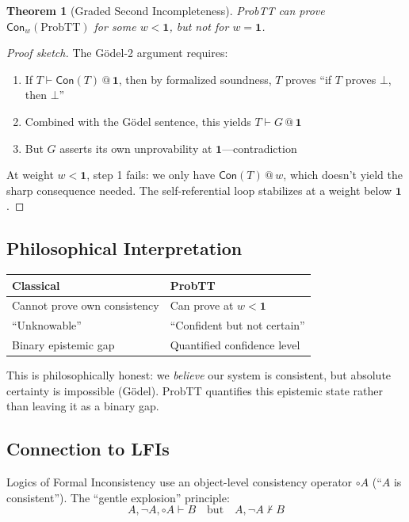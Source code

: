 \documentclass[11pt,a4paper]{article}
\makeatletter
\newtheorem{theorem}{Theorem}[section]
\newcommand{\at}[1]{\,@\,#1}
\newcommand{\one}{\mathbf{1}}
\makeatother
\begin{document}
\begin{theorem}[Graded Second Incompleteness]
ProbTT can prove $\mathsf{Con}_w(\text{ProbTT})$ for some $w < \one$, but not for $w = \one$.
\end{theorem}

\begin{proof}[Proof sketch]
The G\"odel-2 argument requires:
\begin{enumerate}
    \item If $T \vdash \mathsf{Con}(T) \at{\one}$, then by formalized soundness, $T$ proves ``if $T$ proves $\bot$, then $\bot$''
    \item Combined with the G\"odel sentence, this yields $T \vdash G \at{\one}$
    \item But $G$ asserts its own unprovability at $\one$---contradiction
\end{enumerate}

At weight $w < \one$, step 1 fails: we only have $\mathsf{Con}(T) \at{w}$, which doesn't yield the sharp consequence needed. The self-referential loop stabilizes at a weight below $\one$.
\end{proof}

\subsection{Philosophical Interpretation}

\begin{center}
\begin{tabular}{l|l}
\textbf{Classical} & \textbf{ProbTT} \\
\hline
Cannot prove own consistency & Can prove at $w < \one$ \\
``Unknowable'' & ``Confident but not certain'' \\
Binary epistemic gap & Quantified confidence level \\
\end{tabular}
\end{center}

This is philosophically honest: we \emph{believe} our system is consistent, but absolute certainty is impossible (G\"odel). ProbTT quantifies this epistemic state rather than leaving it as a binary gap.

\subsection{Connection to LFIs}

Logics of Formal Inconsistency \citep{carnielli2016paraconsistent} use an object-level consistency operator $\circ A$ (``$A$ is consistent''). The ``gentle explosion'' principle:
\[
A, \neg A, \circ A \vdash B \quad \text{but} \quad A, \neg A \not\vdash B
\]
\end{document}
